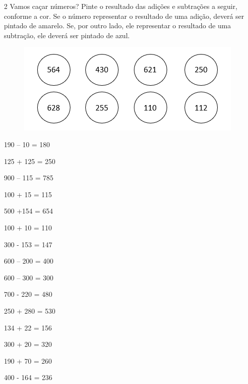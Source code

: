 \pagebreak
\num{2} Vamos caçar números? Pinte o resultado das adições e subtrações a seguir,
conforme a cor. Se o número representar o resultado de uma adição, deverá ser pintado de amarelo. Se, por outro lado, ele representar o resultado de uma subtração, ele deverá ser pintado de azul.

\begin{figure}[htpb!]
\centering
\includegraphics[width=.6\textwidth]{./media/image20.png}
\end{figure}


\begin{minipage}{.5\textwidth}
\begin{escolha}
\item 190 -- 10 = 180

\item 125 + 125 = 250

\item 900 -- 115 = 785

\item 100 + 15 = 115

\item 500 +154 = 654

\item 100 + 10 = 110

\item 300 - 153 = 147

\item 600 -- 200 = 400

\item 600 -- 300 = 300

\item 700 - 220 = 480

\item 250 + 280 = 530

\item 134 + 22 = 156

\item 300 + 20 = 320

\item 190 + 70 = 260

\item 400 - 164 = 236
\end{escolha}
\end{minipage}

